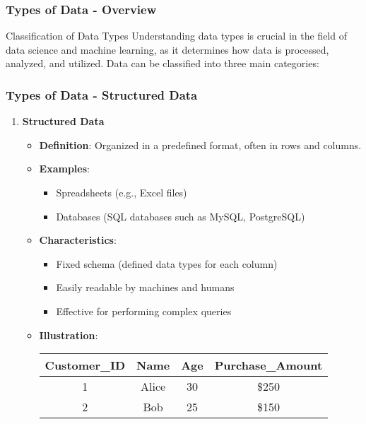 \documentclass[aspectratio=169]{beamer}
\begin{document}
\begin{frame}[fragile]
    \frametitle{Types of Data - Overview}
    \begin{block}{Classification of Data Types}
        Understanding data types is crucial in the field of data science and machine learning, as it determines how data is processed, analyzed, and utilized. Data can be classified into three main categories:
    \end{block}
\end{frame}

\begin{frame}[fragile]
    \frametitle{Types of Data - Structured Data}
    \begin{enumerate}
        \item \textbf{Structured Data}
            \begin{itemize}
                \item \textbf{Definition}: Organized in a predefined format, often in rows and columns.
                \item \textbf{Examples}:
                    \begin{itemize}
                        \item Spreadsheets (e.g., Excel files)
                        \item Databases (SQL databases such as MySQL, PostgreSQL)
                    \end{itemize}
                \item \textbf{Characteristics}:
                    \begin{itemize}
                        \item Fixed schema (defined data types for each column)
                        \item Easily readable by machines and humans
                        \item Effective for performing complex queries
                    \end{itemize}
                \item \textbf{Illustration}:
                \begin{center}
                    \begin{tabular}{|c|c|c|c|}
                    \hline
                    Customer\_ID & Name & Age & Purchase\_Amount \\
                    \hline
                    1 & Alice & 30 & \$250 \\
                    2 & Bob & 25 & \$150 \\
                    \hline
                    \end{tabular}
                \end{center}
            \end{itemize}
    \end{enumerate}
\end{frame}
\end{document}
